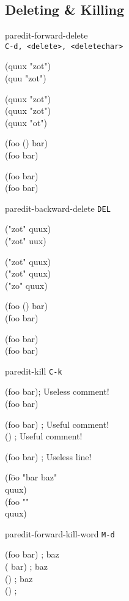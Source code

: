 \documentclass[10pt,landscape,a4paper]{article}
\newenvironment{nstabbing}
  {\setlength{\topsep}{-\parskip}%
   \setlength{\partopsep}{0.2em}%
   \tabbing}
  {\endtabbing}
\begin{document}
\begin{multicols}{4}
    \section*{\large{Deleting \& Killing}}

paredit-forward-delete \\\texttt{C-d, <delete>, <deletechar>}

{\ttfamily
(quu\cursor{}x "zot")\\
(quu\cursor{} "zot")

(quux \cursor"zot")\\
(quux "\cursor zot")\\
(quux "\cursor ot")

(foo (\cursor) bar)\\
(foo \cursor{} bar)

\cursor(foo bar)\\
(\cursor foo bar)
}

paredit-backward-delete \texttt{DEL}

{\ttfamily
("zot" q\cursor uux)\\
("zot" \cursor uux)

("zot"\cursor{} quux)\\
("zot\cursor" quux)\\
("zo\cursor" quux)

(foo (\cursor) bar)\\
(foo \cursor{} bar)

(foo bar)\cursor\\
(foo bar\cursor)
}

paredit-kill \texttt{C-k}

{\ttfamily
(foo bar)\cursor \space \space \space ; Useless comment!\\
(foo bar)\cursor

(\cursor foo bar) \space \space \space ; Useful comment!\\
(\cursor) \space \space \space ; Useful comment!

\cursor(foo bar) \space \space \space ; Useless line!\\
\cursor

\begin{nstabbing}
(f\=oo "\cursor bar baz"\\
\>quux)\\
(foo "\cursor"\\
\>quux)
\end{nstabbing}
}

paredit-forward-kill-word \texttt{M-d}

{\ttfamily
\cursor(foo bar) \space \space \space ; baz\\
(\cursor{} bar) \space \space \space ; baz\\
(\cursor) \space \space \space ; baz\\
() \space \space \space ;\cursor

}
\end{multicols}
\end{document}
